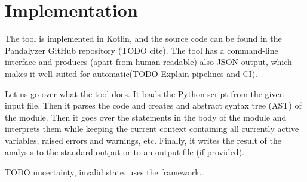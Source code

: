 \section{Implementation}

The tool is implemented in Kotlin, and the source code can be found in the Pandalyzer GitHub repository (TODO cite).
The tool has a command-line interface and produces (apart from human-readable) also JSON output, which makes it well
suited for automatic(TODO Explain pipelines and CI).

Let us go over what the tool does.
It loads the Python script from the given input file.
Then it parses the code and creates and abstract syntax tree (AST) of the module.
Then it goes over the statements in the body of the module and interprets them while keeping the current context
containing all currently active variables, raised errors and warnings, etc.
Finally, it writes the result of the analysis to the standard output or to an output file (if provided).

TODO uncertainty, invalid state, uses the framework\ldots